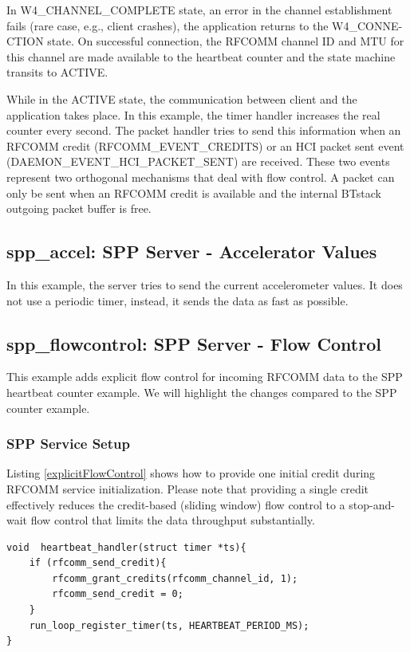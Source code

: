 \documentclass[a4paper,titlepage,oneside,12pt]{amsart} %
\begin{document}
In W4\_CHANNEL\_COMPLETE state, an error in the channel establishment fails (rare case, e.g., client crashes), the application returns to the W4\_CONNE-CTION state. On successful connection, the RFCOMM channel ID and MTU for this channel are made available to the heartbeat counter and the state machine transits to ACTIVE.

While in the ACTIVE state, the communication between client and the application takes place. In this example, the timer handler increases the real counter every second. The packet handler tries to send this information when an RFCOMM credit (RFCOMM\_EVENT\_CREDITS) or an HCI packet sent event (DAEMON\_EVENT\_HCI\_PACKET\_SENT) are received. These two events represent two orthogonal mechanisms that deal with flow control. A packet can only be sent when an RFCOMM credit is available and the internal BTstack outgoing packet buffer is free.


\subsection{spp\_accel: SPP Server - Accelerator Values}
In this example, the server tries to send the current accelerometer values. It does not use a periodic timer, instead, it sends the data as fast as possible. 


\subsection {spp\_flowcontrol: SPP Server - Flow Control}
\label{example:spp_flow_control}
This example adds explicit flow control for incoming RFCOMM data to the SPP heartbeat counter example. We will highlight the changes compared to the SPP counter example. 

\subsubsection{SPP Service Setup}

Listing \ref{explicitFlowControl} shows how to provide one initial credit during RFCOMM service initialization. Please note that providing a single credit effectively reduces the credit-based (sliding window) flow control to a stop-and-wait flow control that limits the data throughput substantially.

\begin{lstlisting}[caption= Heartbeat handler with manual credit management. , label=hbhManual]
void  heartbeat_handler(struct timer *ts){
    if (rfcomm_send_credit){
        rfcomm_grant_credits(rfcomm_channel_id, 1);
        rfcomm_send_credit = 0;
    }
    run_loop_register_timer(ts, HEARTBEAT_PERIOD_MS);
}
\end{lstlisting}
\end{document}
